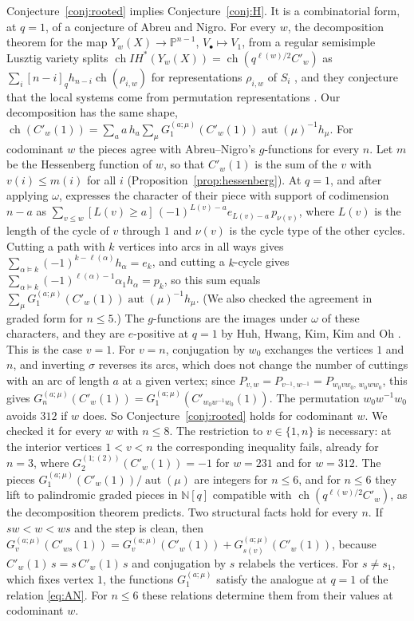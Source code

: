 \documentclass[11pt]{amsart}
\theoremstyle{definition}
\theoremstyle{remark}
\newcommand{\N}{\mathbb{N}}
\newcommand{\Cp}[1]{C'_{#1}(1)}
\DeclareMathOperator{\ch}{ch}
\begin{document}
Conjecture~\ref{conj:rooted} implies Conjecture~\ref{conj:H}. It is a combinatorial form, at $q=1$, of a conjecture of Abreu and Nigro. For every $w$, the decomposition theorem for the map $Y_w(X)\to\mathbb P^{n-1}$, $V_\bullet\mapsto V_1$, from a regular semisimple Lusztig variety splits $\ch IH^*(Y_w(X))=\ch(q^{\ell(w)/2}C'_w)$ as $\sum_i[n-i]_q h_{n-i}\ch(\rho_{i,w})$ for representations $\rho_{i,w}$ of $S_i$ \cite[Cor.~1.9]{AN22b}, and they conjecture that the local systems come from permutation representations \cite[Conj.~1.4]{AN22b}. Our decomposition has the same shape, $\ch(\Cp w)=\sum_a a\,h_a\sum_\mu G^{(a;\mu)}_1(\Cp w)\operatorname{aut}(\mu)^{-1}h_\mu$. For codominant $w$ the pieces agree with Abreu--Nigro's $g$-functions for every $n$. Let $m$ be the Hessenberg function of $w$, so that $\Cp w$ is the sum of the $v$ with $v(i)\le m(i)$ for all $i$ (Proposition~\ref{prop:hessenberg}). At $q=1$, and after applying $\omega$, \cite[Thm.~1.2]{AN23} expresses the character of their piece with support of codimension $n-a$ as $\sum_{v\le w}[L(v)\ge a]\,(-1)^{L(v)-a}e_{L(v)-a}\,p_{\nu(v)}$, where $L(v)$ is the length of the cycle of $v$ through $1$ and $\nu(v)$ is the cycle type of the other cycles. Cutting a path with $k$ vertices into arcs in all ways gives $\sum_{\alpha\models k}(-1)^{k-\ell(\alpha)}h_\alpha=e_k$, and cutting a $k$-cycle gives $\sum_{\alpha\models k}(-1)^{\ell(\alpha)-1}\alpha_1h_\alpha=p_k$, so this sum equals $\sum_\mu G^{(a;\mu)}_1(\Cp w)\operatorname{aut}(\mu)^{-1}h_\mu$. (We also checked the agreement in graded form for $n\le5$.) The $g$-functions are the images under $\omega$ of these characters, and they are $e$-positive at $q=1$ by Huh, Hwang, Kim, Kim and Oh \cite{HHKKO}. This is the case $v=1$. For $v=n$, conjugation by $w_0$ exchanges the vertices $1$ and $n$, and inverting $\sigma$ reverses its arcs, which does not change the number of cuttings with an arc of length $a$ at a given vertex; since $P_{v,w}=P_{v^{-1},w^{-1}}=P_{w_0vw_0,\,w_0ww_0}$, this gives $G^{(a;\mu)}_n(\Cp w)=G^{(a;\mu)}_1(\Cp{w_0w^{-1}w_0})$. The permutation $w_0w^{-1}w_0$ avoids $312$ if $w$ does. So Conjecture~\ref{conj:rooted} holds for codominant $w$. We checked it for every $w$ with $n\le8$. The restriction to $v\in\{1,n\}$ is necessary: at the interior vertices $1<v<n$ the corresponding inequality fails, already for $n=3$, where $G^{(1;(2))}_2(\Cp w)=-1$ for $w=231$ and for $w=312$. The pieces $G^{(a;\mu)}_1(\Cp w)/\operatorname{aut}(\mu)$ are integers for $n\le6$, and for $n\le6$ they lift to palindromic graded pieces in $\N[q]$ compatible with $\ch(q^{\ell(w)/2}C'_w)$, as the decomposition theorem predicts. Two structural facts hold for every $n$. If $sw<w<ws$ and the step is clean, then $G^{(a;\mu)}_v(\Cp{ws})=G^{(a;\mu)}_v(\Cp w)+G^{(a;\mu)}_{s(v)}(\Cp w)$, because $\Cp w\,s=s\,\Cp w\,s$ and conjugation by $s$ relabels the vertices. For $s\ne s_1$, which fixes vertex $1$, the functions $G^{(a;\mu)}_1$ satisfy the analogue at $q=1$ of the relation \eqref{eq:AN}. For $n\le6$ these relations determine them from their values at codominant $w$.
\end{document}
